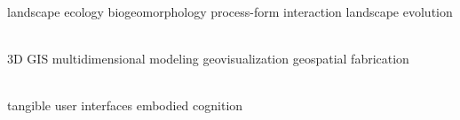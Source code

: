 \documentclass[]{baharmon_cv}
\begin{document}
\vspace*{0.2cm}
 \\ \vspace*{0.1cm}
\normalsize{
landscape ecology \textbullet{} biogeomorphology \textbullet{} process-form interaction \textbullet{} landscape evolution}
\\
\vspace*{0.2cm}

 \vspace{0.1em} \\ \vspace*{0.1cm}
\normalsize{
3D GIS \textbullet{} multidimensional modeling \textbullet{} geovisualization \textbullet{} geospatial fabrication}
\\
\vspace*{0.2cm}

 \vspace{0.1em} \\ \vspace*{0.1cm}
\normalsize{
tangible user interfaces \textbullet{} embodied cognition}
\\

\sectiondivider


\end{document}
